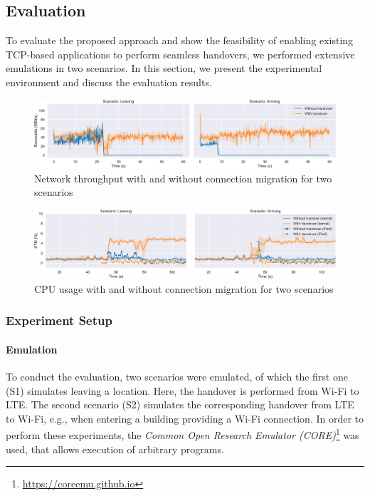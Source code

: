 \subsection{Evaluation}
To evaluate the proposed approach and show the feasibility of enabling existing TCP-based applications to perform seamless handovers, we performed extensive emulations in two scenarios.
In this section, we present the experimental environment and discuss the evaluation results.


\begin{figure}[tb]
    \centering
    \includegraphics[width=\textwidth]{figures/migration/wg_migration-network.pdf}
    \caption{Network throughput with and without connection migration for two scenarios}
    \label{fig:eval:mig:network}
\end{figure}
\begin{figure}[tb]
    \centering
    \includegraphics[width=\textwidth]{figures/migration/wg_migration-cpu.pdf}
    \caption{CPU usage with and without connection migration for two scenarios}
    \label{fig:eval:mig:cpu}
\end{figure}


\subsubsection{Experiment Setup}
\paragraph{Emulation}
To conduct the evaluation, two scenarios were emulated, of which the first one (S1) simulates leaving a location.
Here, the handover is performed from Wi-Fi to LTE.
The second scenario (S2) simulates the corresponding handover from LTE to Wi-Fi, e.g., when entering a building providing a Wi-Fi connection.
In order to perform these experiments, the \emph{Common Open Research Emulator (CORE)}\footnote{\url{https://coreemu.github.io}} was used, that allows execution of arbitrary programs.


